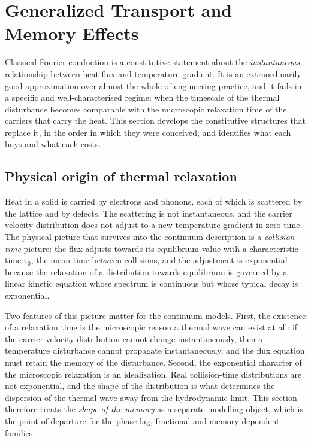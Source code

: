 \section{Generalized Transport and Memory Effects}
\label{sec:transport}

Classical Fourier conduction is a constitutive statement about the \emph{instantaneous} relationship between heat flux and temperature gradient. It is an extraordinarily good approximation over almost the whole of engineering practice, and it fails in a specific and well-characterised regime: when the timescale of the thermal disturbance becomes comparable with the microscopic relaxation time of the carriers that carry the heat. This section develops the constitutive structures that replace it, in the order in which they were conceived, and identifies what each buys and what each costs.

\subsection{Physical origin of thermal relaxation}

Heat in a solid is carried by electrons and phonons, each of which is scattered by the lattice and by defects. The scattering is not instantaneous, and the carrier velocity distribution does not adjust to a new temperature gradient in zero time. The physical picture that survives into the continuum description is a \emph{collision-time} picture: the flux adjusts towards its equilibrium value with a characteristic time $\tau_0$, the mean time between collisions, and the adjustment is exponential because the relaxation of a distribution towards equilibrium is governed by a linear kinetic equation whose spectrum is continuous but whose typical decay is exponential.

Two features of this picture matter for the continuum models. First, the existence of a relaxation time is the microscopic reason a thermal wave can exist at all: if the carrier velocity distribution cannot change instantaneously, then a temperature disturbance cannot propagate instantaneously, and the flux equation must retain the memory of the disturbance. Second, the exponential character of the microscopic relaxation is an idealisation. Real collision-time distributions are not exponential, and the shape of the distribution is what determines the dispersion of the thermal wave away from the hydrodynamic limit. This section therefore treats the \emph{shape of the memory} as a separate modelling object, which is the point of departure for the phase-lag, fractional and memory-dependent families.

